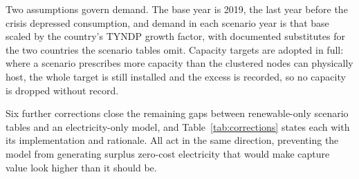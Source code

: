 Two assumptions govern demand. The base year is 2019, the last year before the
crisis depressed consumption, and demand in each scenario year is that base
scaled by the country's TYNDP growth factor, with documented substitutes for
the two countries the scenario tables omit. Capacity targets are adopted in
full: where a scenario prescribes more capacity than the clustered nodes can
physically host, the whole target is still installed and the excess is
recorded, so no capacity is dropped without record.

Six further corrections close the remaining gaps between renewable-only
scenario tables and an electricity-only model, and Table~\ref{tab:corrections}
states each with its implementation and rationale. All act in the same
direction, preventing the model from generating surplus zero-cost electricity
that would make capture value look higher than it should be.
